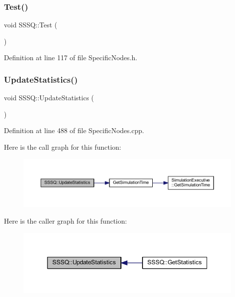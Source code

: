 \subsubsection{\texorpdfstring{Test()}{Test()}}
{\footnotesize\ttfamily void S\+S\+S\+Q\+::\+Test (\begin{DoxyParamCaption}{ }\end{DoxyParamCaption})\hspace{0.3cm}{\ttfamily [inline]}}



Definition at line 117 of file Specific\+Nodes.\+h.

\mbox{\label{class_s_s_s_q_a8d3666772548e12aa39484d22ab5635c}} 
\subsubsection{\texorpdfstring{Update\+Statistics()}{UpdateStatistics()}}
{\footnotesize\ttfamily void S\+S\+S\+Q\+::\+Update\+Statistics (\begin{DoxyParamCaption}{ }\end{DoxyParamCaption})}



Definition at line 488 of file Specific\+Nodes.\+cpp.

Here is the call graph for this function\+:
\nopagebreak
\begin{figure}[H]
\begin{center}
\leavevmode
\includegraphics[width=350pt]{class_s_s_s_q_a8d3666772548e12aa39484d22ab5635c_cgraph}
\end{center}
\end{figure}
Here is the caller graph for this function\+:
\nopagebreak
\begin{figure}[H]
\begin{center}
\leavevmode
\includegraphics[width=345pt]{class_s_s_s_q_a8d3666772548e12aa39484d22ab5635c_icgraph}
\end{center}
\end{figure}


